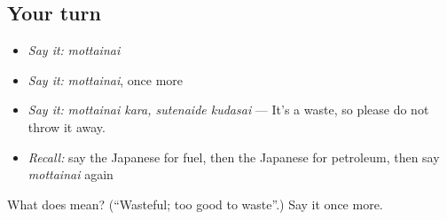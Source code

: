 \subsection*{Your turn}
\begin{itemize}
\raggedright
  \item \emph{Say it:} \emph{mottainai}
  \item \emph{Say it:} \emph{mottainai}, once more
  \item \emph{Say it:} \emph{mottainai kara, sutenaide kudasai} — It's a waste, so please do not throw it away.
  \item \emph{Recall:} say the Japanese for fuel, then the Japanese for petroleum, then say \emph{mottainai} again
\end{itemize}

\begin{tcolorbox}[breakable,colback=teal!4,colframe=teal!35!black,title={Before you move on}]
What does  mean? (\textquotedblleft{}Wasteful; too good to waste\textquotedblright{}.) Say it once more.
\end{tcolorbox}
